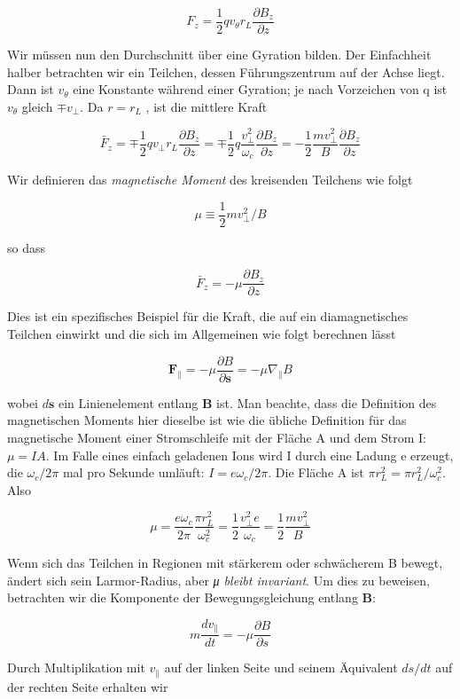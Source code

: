 \documentclass[
  a4paper,
  DIV=11]{scrreprt}
\begin{document}
\[
F_z = \frac{1}{2}q v_\theta r_L \frac{\partial B_z}{\partial z}
\]

Wir müssen nun den Durchschnitt über eine Gyration bilden. Der
Einfachheit halber betrachten wir ein Teilchen, dessen Führungszentrum
auf der Achse liegt. Dann ist \(v_\theta\) eine Konstante während einer
Gyration; je nach Vorzeichen von q ist \(v_\theta\) gleich
\(\mp v_\perp\). Da \(r = r_L\) , ist die mittlere Kraft

\[
\bar{F}_z = \mp \frac{1}{2}q v_\perp r_L \frac{\partial B_z}{\partial z} = \mp \frac{1}{2}q\frac{v_\perp^2}{\omega_c} \frac{\partial B_z}{\partial z} = -\frac{1}{2}\frac{mv_\perp^2}{B} \frac{\partial B_z}{\partial z}
\]

Wir definieren das \emph{magnetische Moment} des kreisenden Teilchens
wie folgt

\[
\mu \equiv \frac{1}{2}mv_\perp^2 / B
\]

so dass

\[
\bar{F}_z = -\mu \frac{\partial B_z}{\partial z}
\]

Dies ist ein spezifisches Beispiel für die Kraft, die auf ein
diamagnetisches Teilchen einwirkt und die sich im Allgemeinen wie folgt
berechnen lässt

\[
\mathbf{F}_\parallel = -\mu\frac{\partial B}{\partial \mathbf{s}} = -\mu\nabla_\parallel B
\]

wobei \(d\mathbf{s}\) ein Linienelement entlang \(\mathbf{B}\) ist. Man
beachte, dass die Definition des magnetischen Moments hier dieselbe ist
wie die übliche Definition für das magnetische Moment einer
Stromschleife mit der Fläche A und dem Strom I: \(\mu = IA\). Im Falle
eines einfach geladenen Ions wird I durch eine Ladung e erzeugt, die
\(\omega_c / 2\pi\) mal pro Sekunde umläuft: \(I = e\omega_c/2\pi\). Die
Fläche A ist \(\pi r_L^2 = \pi r_L^2/\omega_c^2\). Also

\[
\mu = \frac{e\omega_c}{2\pi}\frac{\pi r_L^2}{\omega_c^2} = \frac{1}{2}\frac{v_\perp^2 e}{\omega_c} = \frac{1}{2}\frac{mv_\perp^2}{B}
\]

Wenn sich das Teilchen in Regionen mit stärkerem oder schwächerem B
bewegt, ändert sich sein Larmor-Radius, aber \emph{μ bleibt invariant}.
Um dies zu beweisen, betrachten wir die Komponente der
Bewegungsgleichung entlang \(\mathbf{B}\):

\[
m\frac{dv_\parallel}{dt} = -\mu \frac{\partial B}{\partial s}
\]

Durch Multiplikation mit \(v_\parallel\) auf der linken Seite und seinem
Äquivalent \(ds/dt\) auf der rechten Seite erhalten wir
\end{document}
